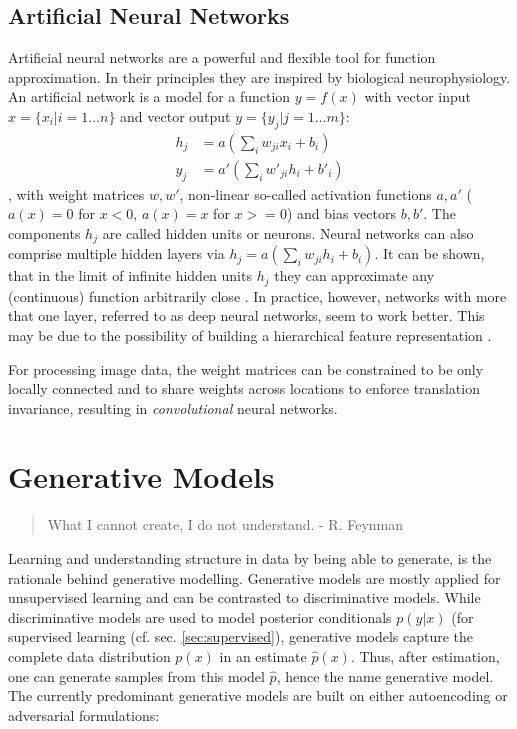 	\subsection{Artificial Neural Networks}\label{sec:neuralnetworks}
		Artificial neural networks are a powerful and flexible tool for function approximation. In their principles they are inspired by biological neurophysiology. An artificial network is a model for a function $y = f(x)$ with vector input $x = \{ x_i | i = 1 \ldots n \}$ and vector output $y = \{ y_j | j = 1 \ldots m \}$:
		\begin{equation} \label{eq1}
			\begin{split}
				h_j & =  a (\sum_i w_{ji} x_i + b_i)  \\
				y_j & =  a' (\sum_i w'_{ji} h_i + b'_i)
			\end{split}
		\end{equation},
		with weight matrices $w, w'$, non-linear so-called activation functions $a, a'$ (\eg $a(x)=0$ for $x<0$, $a(x)=x$ for $x>=0$) and bias vectors $b, b'$.
		The components $h_j$ are called hidden units or neurons. Neural networks can also comprise multiple hidden layers via $h_j  =  a (\sum_i w_{ji} h_i + b_i)$.
		It can be shown, that in the limit of infinite hidden units $h_j$ they can approximate any (continuous) function arbitrarily close \cite{cybenko89approx, hornik91approx}.
		In practice, however, networks with more that one layer, referred to as deep neural networks, seem to work better. This may be due to the possibility of building a hierarchical feature representation \cite{zeiler14vis}.

		For processing image data, the weight matrices can be constrained to be only locally connected and to share weights across locations to enforce translation invariance, resulting in \textit{convolutional} neural networks.

\section{Generative Models}\label{sec:genmodel}
	\begin{quote}
	    What I cannot create, I do not understand. - R. Feynman
	\end{quote}
	Learning and understanding structure in data by being able to generate, is the rationale behind generative modelling.
	Generative models are mostly applied for unsupervised learning and can be contrasted to discriminative models. While discriminative models are used to model posterior conditionals $p(y|x)$ (\eg for supervised learning (cf. sec. \ref{sec:supervised}), generative models capture the complete data distribution $p(x)$ in an estimate $\hat p(x)$. Thus, after estimation, one can generate samples from this model $\hat p$, hence the name generative model.
	The currently predominant generative models are built on either autoencoding or adversarial formulations:

